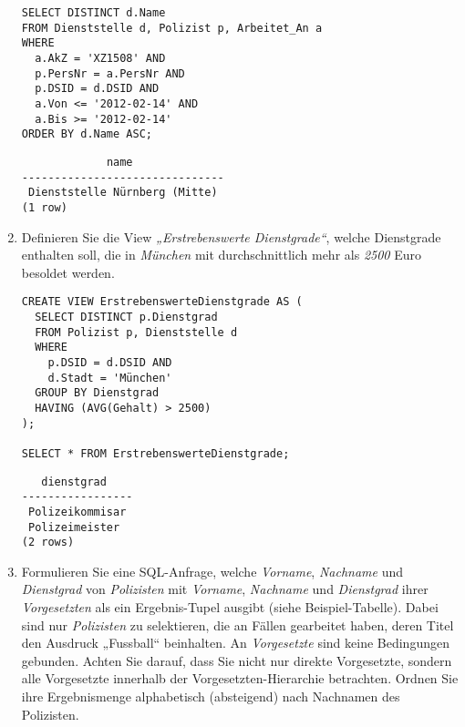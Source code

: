 \documentclass{bschlangaul-aufgabe}
\begin{document}
\begin{enumerate}
\begin{liAntwort}
\begin{verbatim}
SELECT DISTINCT d.Name
FROM Dienststelle d, Polizist p, Arbeitet_An a
WHERE
  a.AkZ = 'XZ1508' AND
  p.PersNr = a.PersNr AND
  p.DSID = d.DSID AND
  a.Von <= '2012-02-14' AND
  a.Bis >= '2012-02-14'
ORDER BY d.Name ASC;
\end{verbatim}

\begin{verbatim}
             name
-------------------------------
 Dienststelle Nürnberg (Mitte)
(1 row)
\end{verbatim}
\end{liAntwort}


\item Definieren Sie die View \emph{„Erstrebenswerte Dienstgrade“},
welche Dienstgrade enthalten soll, die in \emph{München} mit
durchschnittlich mehr als \emph{2500} Euro besoldet werden.

\begin{liAntwort}
\begin{verbatim}
CREATE VIEW ErstrebenswerteDienstgrade AS (
  SELECT DISTINCT p.Dienstgrad
  FROM Polizist p, Dienststelle d
  WHERE
    p.DSID = d.DSID AND
    d.Stadt = 'München'
  GROUP BY Dienstgrad
  HAVING (AVG(Gehalt) > 2500)
);

SELECT * FROM ErstrebenswerteDienstgrade;
\end{verbatim}

\begin{verbatim}
   dienstgrad
-----------------
 Polizeikommisar
 Polizeimeister
(2 rows)
\end{verbatim}
\end{liAntwort}


\item Formulieren Sie eine SQL-Anfrage, welche \emph{Vorname},
\emph{Nachname} und \emph{Dienstgrad} von \emph{Polizisten} mit
\emph{Vorname}, \emph{Nachname} und \emph{Dienstgrad} ihrer
\emph{Vorgesetzten} als ein Ergebnis-Tupel ausgibt (siehe
Beispiel-Tabelle). Dabei sind nur \emph{Polizisten} zu selektieren, die
an Fällen gearbeitet haben, deren Titel den Ausdruck „Fussball“
beinhalten. An \emph{Vorgesetzte} sind keine Bedingungen gebunden.
Achten Sie darauf, dass Sie nicht nur direkte Vorgesetzte, sondern alle
Vorgesetzte innerhalb der Vorgesetzten-Hierarchie betrachten. Ordnen Sie
ihre Ergebnismenge alphabetisch (absteigend) nach Nachnamen des
Polizisten.


\end{enumerate}
\end{document}

